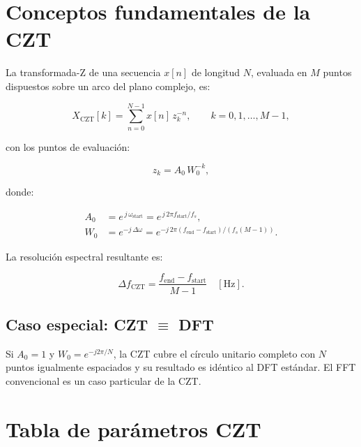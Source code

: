 \documentclass[12pt, a4paper, twoside]{report}
\begin{document}
\section{Conceptos fundamentales de la CZT}
\label{sec:czt_teoria}

La transformada-Z de una secuencia $x[n]$ de longitud $N$, evaluada en
$M$ puntos dispuestos sobre un arco del plano complejo, es:

\begin{equation}
  X_\text{CZT}[k] = \sum_{n=0}^{N-1} x[n]\, z_k^{-n},
  \qquad k = 0, 1, \ldots, M-1,
  \label{eq:czt_def}
\end{equation}

con los puntos de evaluación:

\begin{equation}
  z_k = A_0\, W_0^{-k},
  \label{eq:zk}
\end{equation}

donde:

\begin{align}
  A_0 &= e^{\,j\,\omega_\text{start}} = e^{\,j\,2\pi f_\text{start}/f_s}, \label{eq:A0}\\
  W_0 &= e^{-j\,\Delta\omega} = e^{-j\,2\pi(f_\text{end}-f_\text{start})/(f_s(M-1))}. \label{eq:W0}
\end{align}

La resolución espectral resultante es:

\begin{equation}
  \Delta f_\text{CZT} = \frac{f_\text{end} - f_\text{start}}{M-1}\quad[\text{Hz}].
  \label{eq:res_czt}
\end{equation}

\subsection*{Caso especial: CZT $\equiv$ DFT}

Si $A_0 = 1$ y $W_0 = e^{-j2\pi/N}$, la CZT cubre el círculo unitario
completo con $N$ puntos igualmente espaciados y su resultado es
idéntico al DFT estándar. El FFT convencional es un caso particular
de la CZT.

\section{Tabla de parámetros CZT}
\label{sec:tabla_czt}
\end{document}
